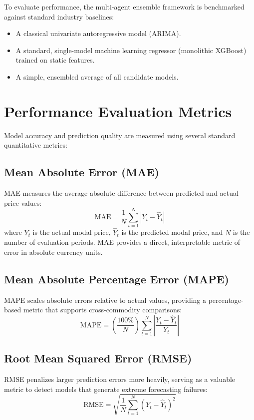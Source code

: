 \documentclass[12pt,a4paper]{report}
\theoremstyle{definition}
\theoremstyle{remark}
\begin{document}
To evaluate performance, the multi-agent ensemble framework is benchmarked against standard industry baselines:
\begin{itemize}
    \item A classical univariate autoregressive model (ARIMA).
    \item A standard, single-model machine learning regressor (monolithic XGBoost) trained on static features.
    \item A simple, ensembled average of all candidate models.
\end{itemize}

\section{Performance Evaluation Metrics}

Model accuracy and prediction quality are measured using several standard quantitative metrics:

\subsection{Mean Absolute Error (MAE)}
MAE measures the average absolute difference between predicted and actual price values:
\begin{equation}
    \text{MAE} = \frac{1}{N} \sum_{t=1}^N \left| Y_t - \hat{Y}_t \right|
\end{equation}
where $Y_t$ is the actual modal price, $\hat{Y}_t$ is the predicted modal price, and $N$ is the number of evaluation periods. MAE provides a direct, interpretable metric of error in absolute currency units.

\subsection{Mean Absolute Percentage Error (MAPE)}
MAPE scales absolute errors relative to actual values, providing a percentage-based metric that supports cross-commodity comparisons:
\begin{equation}
    \text{MAPE} = \left( \frac{100\%}{N} \right) \sum_{t=1}^N \left| \frac{Y_t - \hat{Y}_t}{Y_t} \right|
\end{equation}

\subsection{Root Mean Squared Error (RMSE)}
RMSE penalizes larger prediction errors more heavily, serving as a valuable metric to detect models that generate extreme forecasting failures:
\begin{equation}
    \text{RMSE} = \sqrt{ \frac{1}{N} \sum_{t=1}^N \left( Y_t - \hat{Y}_t \right)^2 }
\end{equation}
\end{document}
